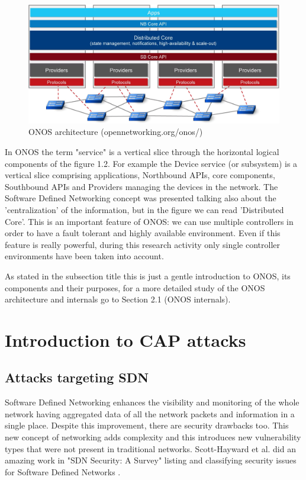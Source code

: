 \begin{figure}[t]
\caption{ONOS architecture (opennetworking.org/onos/)}
\label{fig:onos-arch}
\includegraphics[width=1.0\textwidth]{resources/Chapter-1/onos-arch.jpg}
\centering
\end{figure}

In ONOS the term "service" is a vertical slice through the horizontal logical components of the figure 1.2. For example the Device service (or subsystem) is a vertical slice comprising applications, Northbound APIs, core components, Southbound APIs and Providers managing the devices in the network. The Software Defined Networking concept was presented talking also about the 'centralization' of the information, but in the figure we can read 'Distributed Core'. This is an important feature of ONOS: we can use multiple controllers in order to have a fault tolerant and highly available environment. Even if this feature is really powerful, during this research activity only single controller environments have been taken into account. 

As stated in the subsection title this is just a gentle introduction to ONOS, its components and their purposes, for a more detailed study of the ONOS architecture and internals go to Section 2.1 (ONOS internals).  

\clearpage

\section{Introduction to CAP attacks}

\subsection{Attacks targeting SDN}

Software Defined Networking enhances the visibility and monitoring of the whole network having aggregated data of all the network packets and information in a single place. Despite this improvement, there are security drawbacks too. This new concept of networking adds complexity and this introduces new vulnerability types that were not present in traditional networks. Scott-Hayward et al. did an amazing work in "SDN Security: A Survey" listing and classifying security issues for Software Defined Networks \cite{sdn-security-survey}.

